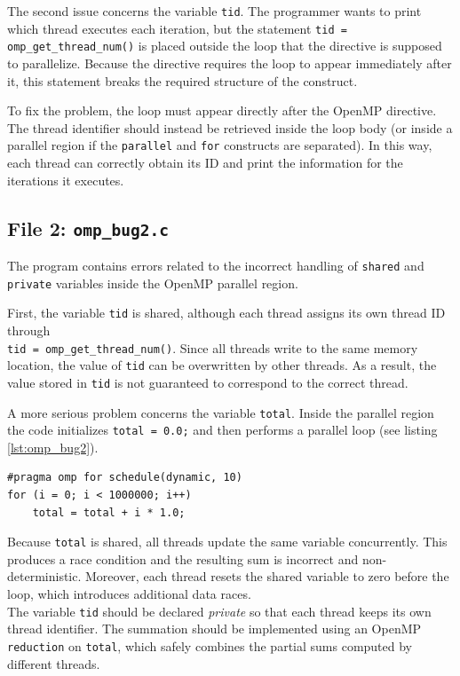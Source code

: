 \documentclass[unicode,10pt,a4paper,oneside,numbers=endperiod,openany]{scrartcl}
\begin{document}
The second issue concerns the variable \texttt{tid}. The programmer wants to
print which thread executes each iteration, but the statement \texttt{tid = omp\_get\_thread\_num()} is placed outside the loop that the directive is supposed to parallelize. Because the directive requires the loop to appear immediately after it, this
statement breaks the required structure of the construct.

To fix the problem, the loop must appear directly after the OpenMP directive.
The thread identifier should instead be retrieved inside the loop body (or
inside a parallel region if the \texttt{parallel} and \texttt{for} constructs
are separated). In this way, each thread can correctly obtain its ID and print
the information for the iterations it executes.

\subsection{File 2: \texttt{omp\_bug2.c}}
The program contains errors related to the incorrect handling of \texttt{shared} and \texttt{private} variables inside the OpenMP parallel region.

First, the variable \texttt{tid} is shared, although each thread assigns its own thread ID through \\\texttt{tid = omp\_get\_thread\_num()}.
Since all threads write to the same memory location, the value of \texttt{tid} can be overwritten by other threads. As a result, the value stored in \texttt{tid} is not guaranteed to correspond to the correct thread.

A more serious problem concerns the variable \texttt{total}. Inside the parallel region the code initializes \texttt{total = 0.0;} and then performs a parallel loop (see listing \ref{lst:omp_bug2}).
\begin{lstlisting}[style=grayverbatim,label={lst:omp_bug2},caption={Incorrect handling of shared and private variables in an OpenMP parallel region}]
#pragma omp for schedule(dynamic, 10)
for (i = 0; i < 1000000; i++)
    total = total + i * 1.0;
\end{lstlisting}
Because \texttt{total} is shared, all threads update the same variable concurrently. This produces a race condition and the resulting sum is incorrect and non-deterministic. Moreover, each thread resets the shared variable to zero before the loop, which introduces additional data races.\\
 The variable \texttt{tid} should be declared \emph{private} so that each thread keeps its own thread identifier. The summation should be implemented using an OpenMP \texttt{reduction} on \texttt{total}, which safely combines the partial sums computed by different threads.
\end{document}
